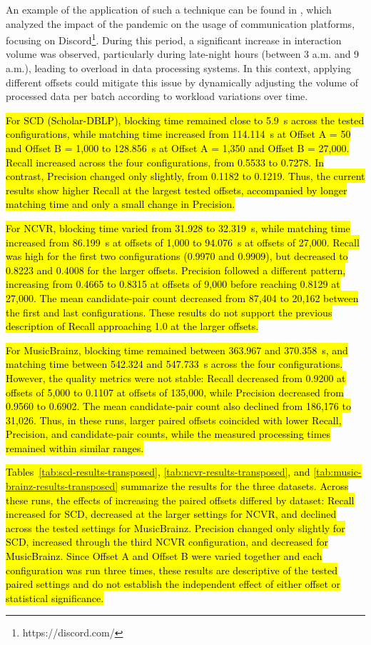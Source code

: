 \documentclass{ieeeaccess}
\begin{document}
An example of the application of such a technique can be found in \cite{webmedia}, which analyzed the impact of the pandemic on the usage of communication platforms, focusing on Discord\footnote{https://discord.com/}. During this period, a significant increase in interaction volume was observed, particularly during late-night hours (between 3 a.m. and 9 a.m.), leading to overload in data processing systems. In this context, applying different offsets could mitigate this issue by dynamically adjusting the volume of processed data per batch according to workload variations over time.

\hl{For SCD (Scholar-DBLP), blocking time remained close to 5.9~s across the tested configurations, while matching time increased from 114.114~s at Offset A = 50 and Offset B = 1,000 to 128.856~s at Offset A = 1,350 and Offset B = 27,000. Recall increased across the four configurations, from 0.5533 to 0.7278. In contrast, Precision changed only slightly, from 0.1182 to 0.1219. Thus, the current results show higher Recall at the largest tested offsets, accompanied by longer matching time and only a small change in Precision.}

\hl{For NCVR, blocking time varied from 31.928 to 32.319~s, while matching time increased from 86.199~s at offsets of 1,000 to 94.076~s at offsets of 27,000. Recall was high for the first two configurations (0.9970 and 0.9909), but decreased to 0.8223 and 0.4008 for the larger offsets. Precision followed a different pattern, increasing from 0.4665 to 0.8315 at offsets of 9,000 before reaching 0.8129 at 27,000. The mean candidate-pair count decreased from 87,404 to 20,162 between the first and last configurations. These results do not support the previous description of Recall approaching 1.0 at the larger offsets.}

\hl{For MusicBrainz, blocking time remained between 363.967 and 370.358~s, and matching time between 542.324 and 547.733~s across the four configurations. However, the quality metrics were not stable: Recall decreased from 0.9200 at offsets of 5,000 to 0.1107 at offsets of 135,000, while Precision decreased from 0.9560 to 0.6902. The mean candidate-pair count also declined from 186,176 to 31,026. Thus, in these runs, larger paired offsets coincided with lower Recall, Precision, and candidate-pair counts, while the measured processing times remained within similar ranges.}

\hl{Tables~\ref{tab:scd-results-transposed}, \ref{tab:ncvr-results-transposed}, and \ref{tab:music-brainz-results-transposed} summarize the results for the three datasets. Across these runs, the effects of increasing the paired offsets differed by dataset: Recall increased for SCD, decreased at the larger settings for NCVR, and declined across the tested settings for MusicBrainz. Precision changed only slightly for SCD, increased through the third NCVR configuration, and decreased for MusicBrainz. Since Offset A and Offset B were varied together and each configuration was run three times, these results are descriptive of the tested paired settings and do not establish the independent effect of either offset or statistical significance.}
\end{document}

